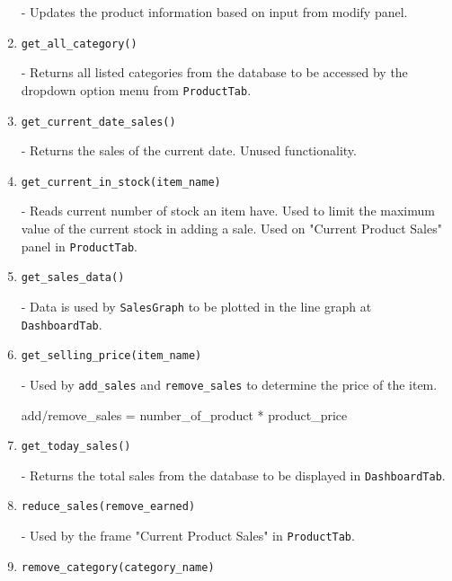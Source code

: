 \documentclass[12pt,a4paper]{article}
\begin{document}
\begin{enumerate}
                - Updates the product information based on input from modify panel.

            \item[\ding{118}]\texttt{get\_all\_category()}

                - Returns all listed categories from the database to be accessed 
                by the dropdown option menu from \texttt{ProductTab}.

            \item[\ding{118}]\texttt{get\_current\_date\_sales()}

                - Returns the sales of the current date. Unused functionality.

            \item[\ding{118}]\texttt{get\_current\_in\_stock(item\_name)}

                - Reads current number of stock an item have. Used to limit the 
                maximum value of the current stock in adding a sale. Used 
                on "Current Product Sales" panel in \texttt{ProductTab}.

            \item[\ding{118}]\texttt{get\_sales\_data()}

                - Data is used by \texttt{SalesGraph} to be plotted in the line graph 
                at \texttt{DashboardTab}.

            \item[\ding{118}]\texttt{get\_selling\_price(item\_name)}

                - Used by \texttt{add\_sales} and \texttt{remove\_sales} to 
                determine the price of the item.

                add/remove\_sales = number\_of\_product * product\_price

            \item[\ding{118}]\texttt{get\_today\_sales()}

                - Returns the total sales from the database to be displayed 
                in \texttt{DashboardTab}.

            \item[\ding{118}]\texttt{reduce\_sales(remove\_earned)}

                - Used by the frame "Current Product Sales" in \texttt{ProductTab}.

            \item[\ding{118}]\texttt{remove\_category(category\_name)}


\end{enumerate}
\end{document}
